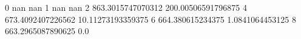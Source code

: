0 nan nan
1 nan nan
2 863.3015747070312 200.00506591796875
4 673.4092407226562 10.11273193359375
6 664.380615234375 1.0841064453125
8 663.2965087890625 0.0

